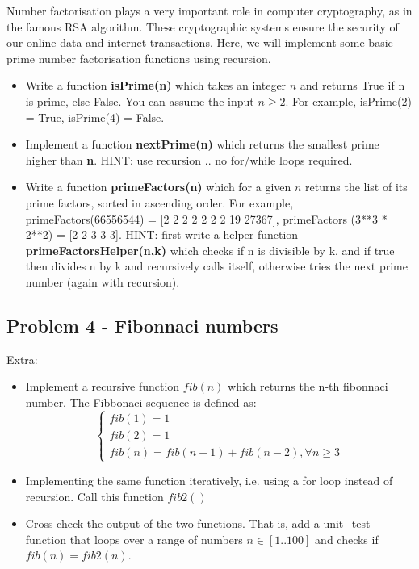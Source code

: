 \documentclass[11pt,a4paper]{report}
\begin{document}
Number factorisation plays a very important role in computer cryptography, as in the famous RSA algorithm. These cryptographic systems ensure the security of our online data and internet transactions. Here, we will implement some basic prime number factorisation functions using recursion. 

\begin{itemize}
 \item Write a function \textbf{isPrime(n)} which takes an integer $n$ and returns True if n is prime, else False. You can assume the input $n \ge 2$. For example, isPrime(2) = True, isPrime(4) = False. 
 \item Implement a function \textbf{nextPrime(n)} which returns the smallest prime higher than \textbf{n}. HINT: use recursion .. no for/while loops required.
 \item Write a function \textbf{primeFactors(n)} which for a given $n$ returns the list of its prime factors, sorted in ascending order. For example, primeFactors(66556544) = [2 2 2 2 2 2 2 19 27367], primeFactors (3**3 * 2**2) = [2 2 3 3 3]. HINT: first write a helper function \textbf{primeFactorsHelper(n,k)} which checks if n is divisible by k, and if true then divides n by k and recursively calls itself, otherwise tries the next prime number (again with recursion).  
\end{itemize}

\subsection*{Problem 4  - Fibonnaci numbers}

Extra: 
\begin{itemize}
 \item Implement a recursive function $fib(n)$ which returns the n-th fibonnaci number. The Fibbonaci sequence is defined as:
$$\begin{cases}
fib(1) = 1\\
fib(2) = 1\\
fib(n) = fib(n-1) + fib(n-2), \forall n \ge 3
\end{cases} $$
 \item Implementing the same function iteratively, i.e. using a for loop instead of recursion. Call this function $fib2()$
 \item Cross-check the output of the two functions. That is, add a unit\_test function that loops over a range of numbers $n \in [1 .. 100]$ and checks if $fib(n) = fib2(n)$.
\end{itemize}
\end{document}
